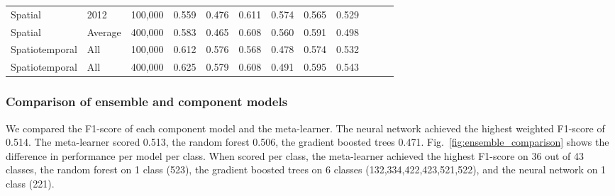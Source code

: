 \begin{table}[!hbt]
{\begin{tabular}{lll|ll|ll|lllll}
        Spatial & 2012 & 100,000 & 0.559 & 0.476 & 0.611 & 0.574 & 0.565 & 0.529 &  &  &  \\
        Spatial & Average & 400,000 & 0.583 & 0.465 & 0.608 & 0.560 & 0.591 & 0.498 &  &  &  \\
        Spatiotemporal & All & 100,000 & 0.612 & 0.576 & 0.568 & 0.478 & 0.574 & 0.532 &  &  &  \\
        Spatiotemporal & All & 400,000 & 0.625 & 0.579 & 0.608 & 0.491 & 0.595 & 0.543 &  &  &  \\ \cline{1-9}
        \end{tabular}%
        }
        \end{table}
    
        
    \subsubsection*{Comparison of ensemble and component models}
    
        We compared the F1-score of each component model and the meta-learner. The neural network achieved the highest weighted F1-score of 0.514. The meta-learner scored 0.513, the random forest 0.506, the gradient boosted trees 0.471. Fig.\@~\ref{fig:ensemble_comparison} shows the difference in performance per model per class. When scored per class, the meta-learner achieved the highest F1-score on 36 out of 43 classes, the random forest on 1 class (523), the gradient boosted trees on 6 classes (132,334,422,423,521,522), and the neural network on 1 class (221).
        
